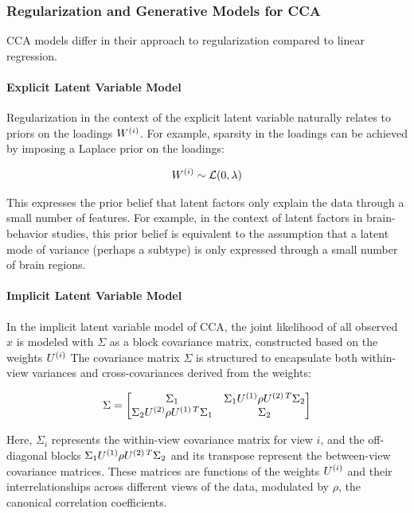 \subsubsection{Regularization and Generative Models for CCA}
CCA models differ in their approach to regularization compared to linear regression.

\paragraph{Explicit Latent Variable Model}
Regularization in the context of the explicit latent variable naturally relates to priors on the loadings \(W^{(i)}\).
For example, sparsity in the loadings can be achieved by imposing a Laplace prior on the loadings:

\begin{align}
    W^{(i)} \sim \mathcal{L}(0, \lambda)
\end{align}

This expresses the prior belief that latent factors only explain the data through a small number of features.
For example, in the context of latent factors in brain-behavior studies, this prior belief is equivalent to the assumption that a latent mode of variance (perhaps a subtype) is only expressed through a small number of brain regions.

\paragraph{Implicit Latent Variable Model}
In the implicit latent variable model of CCA, the joint likelihood of all observed \(x\) is modeled with \(\Sigma\) as a block covariance matrix, constructed based on the weights \(U^{(i)}\)
The covariance matrix \(\Sigma\) is structured to encapsulate both within-view variances and cross-covariances derived from the weights:

\begin{equation}
    \Sigma = \begin{bmatrix}
                 \Sigma_{1} & \Sigma_{1} U^{(1)} \rho U^{(2)\,T} \Sigma_{2} \\
                 \Sigma_{2} U^{(2)} \rho U^{(1)\,T} \Sigma_{1} & \Sigma_{2}
    \end{bmatrix}
\end{equation}

Here, \(\Sigma_{i}\) represents the within-view covariance matrix for view \(i\), and the off-diagonal blocks \(\Sigma_{1} U^{(1)} \rho U^{(2)\,T} \Sigma_{2}\) and its transpose represent the between-view covariance matrices.
These matrices are functions of the weights \(U^{(i)}\) and their interrelationships across different views of the data, modulated by \(\rho\), the canonical correlation coefficients.

